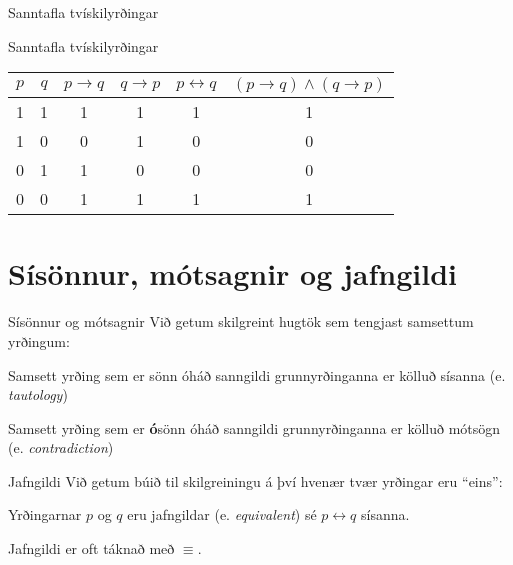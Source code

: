 \documentclass{beamer}
\begin{document}
\begin{frame}{Sanntafla tvískilyrðingar}
\begin{center}
Sanntafla tvískilyrðingar
\begin{tabular}{cccccc}
\toprule
$p$&$q$&$p \to q$&$q \to p$&$p \leftrightarrow q$&$(p \to q) \land (q \to p)$\\
\midrule
1&1&1&1&1&1\\
1&0&0&1&0&0\\
0&1&1&0&0&0\\
0&0&1&1&1&1\\
\bottomrule
\end{tabular}
\end{center}
\end{frame}

\section{Sísönnur, mótsagnir og jafngildi}

\begin{frame}{Sísönnur og mótsagnir}
Við getum skilgreint hugtök sem tengjast samsettum yrðingum:

\begin{tcolorbox}[title=Sísanna]
Samsett yrðing sem er sönn óháð sanngildi grunnyrðinganna er kölluð sísanna (e. \emph{tautology})
\end{tcolorbox}

\begin{tcolorbox}[title=Mótsögn]
Samsett yrðing sem er \textbf{ó}sönn óháð sanngildi grunnyrðinganna er kölluð mótsögn (e. \emph{contradiction})
\end{tcolorbox}
\end{frame}

\begin{frame}{Jafngildi}
Við getum búið til skilgreiningu á því hvenær tvær yrðingar eru ``eins'':

\begin{tcolorbox}[title=Jafngildi]
Yrðingarnar $p$ og $q$ eru jafngildar (e. \emph{equivalent}) sé $p \leftrightarrow q$ sísanna.
\end{tcolorbox}

Jafngildi er oft táknað með $\equiv$.
\end{frame}
\end{document}
